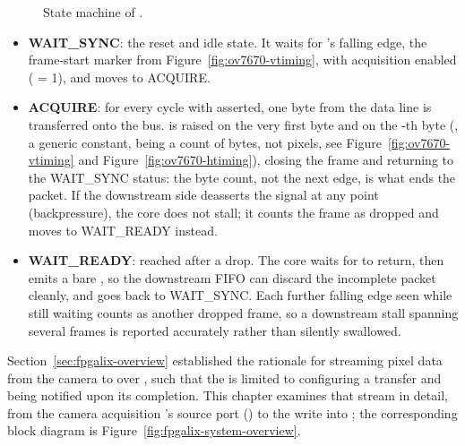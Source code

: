 \begin{figure}[htbp]
    \centering
    
    \caption{State machine of .}
    \label{fig:ov7670-data-interface-fsm}
\end{figure}

\begin{itemize}
    \item \textbf{WAIT\_SYNC}: the reset and idle state. It waits for 's falling edge, the frame-start marker from Figure~\ref{fig:ov7670-vtiming}, with acquisition enabled ( = 1), and moves to ACQUIRE.
    \item \textbf{ACQUIRE}: for every  cycle with  asserted, one byte from the  data line is transferred onto the  bus.  is raised on the very first byte and  on the -th byte (, a  generic constant, being a count of bytes, not pixels, see Figure~\ref{fig:ov7670-vtiming} and Figure~\ref{fig:ov7670-htiming}), closing the frame and returning to the WAIT\_SYNC status: the byte count, not the next  edge, is what ends the packet. If the downstream side deasserts the  signal at any point (backpressure), the core does not stall; it counts the frame as dropped and moves to WAIT\_READY instead.
    \item \textbf{WAIT\_READY}: reached after a drop. The core waits for  to return, then emits a bare , so the downstream FIFO can discard the incomplete packet cleanly, and goes back to WAIT\_SYNC. Each further  falling edge seen while still waiting counts as another dropped frame, so a downstream stall spanning several frames is reported accurately rather than silently
swallowed.
\end{itemize}


Section~\ref{sec:fpgalix-overview} established the rationale for streaming pixel data from the camera to  over , such that the  is limited to configuring a transfer and being notified upon its completion. This chapter examines that stream in detail, from the camera acquisition 's  source port () to the write into  ; the corresponding block diagram is Figure~\ref{fig:fpgalix-system-overview}.

